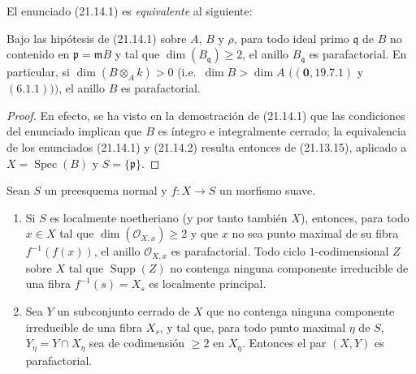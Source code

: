 El enunciado (21.14.1) es \emph{equivalente} al siguiente:

\begin{corollary}[21.14.2]
\label{IV.21.14.2}
Bajo las hipótesis de \textup{(21.14.1)} sobre $A$, $B$ y $\rho$, para todo ideal primo
$\mathfrak q$ de $B$ no contenido en $\mathfrak p=\mathfrak mB$ y tal que
$\dim(B_\mathfrak q)\geq2$, el anillo $B_\mathfrak q$ es parafactorial. En
particular, si $\dim(B\otimes_A k)>0$ \textup{(}i.e.\ $\dim B>\dim A$
$((\mathbf 0, 19.7.1)$ y $(6.1.1)))$, el anillo $B$ es parafactorial.
\end{corollary}

\begin{proof}
En efecto, se ha visto en la demostración de (21.14.1) que las condiciones del enunciado
implican que $B$ es íntegro e integralmente cerrado; la equivalencia de los enunciados
(21.14.1) y (21.14.2) resulta entonces de (21.13.15), aplicado a
$X=\operatorname{Spec}(B)$ y $S=\{\mathfrak p\}$.
\end{proof}

\begin{proposition}[21.14.3]
\label{IV.21.14.3}
Sean $S$ un preesquema normal y $f:X\to S$ un morfismo suave.
\begin{enumerate}[label=\textup{(\roman*)}]
  \item Si $S$ es localmente noetheriano \textup{(}y por tanto también $X$\textup{)}, entonces, para todo $x\in X$
  tal que $\dim(\mathcal O_{X,x})\geq2$ y que $x$ no sea punto maximal de su
  fibra $f^{-1}(f(x))$, el anillo $\mathcal O_{X,x}$ es parafactorial. Todo ciclo
  $1$-codimensional $Z$ sobre $X$ tal que $\operatorname{Supp}(Z)$ no contenga ninguna
  componente irreducible de una fibra $f^{-1}(s)=X_s$ es localmente principal.
  \item Sea $Y$ un subconjunto cerrado de $X$ que no contenga ninguna componente irreducible
  de una fibra $X_s$, y tal que, para todo punto maximal $\eta$ de $S$,
  $Y_\eta=Y\cap X_\eta$ sea de codimensión $\geq2$ en $X_\eta$. Entonces el par
  $(X,Y)$ es parafactorial.
\end{enumerate}
\end{proposition}


